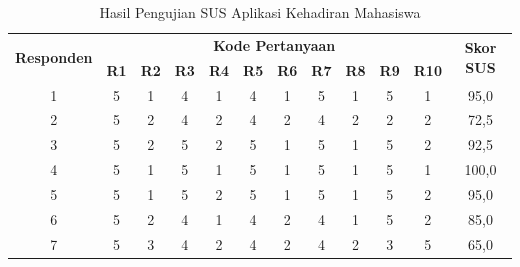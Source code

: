 \begin{table}[H]
\fontsize{10}{12}\selectfont
\center
\caption{Hasil Pengujian SUS Aplikasi Kehadiran Mahasiswa}
\label{sus-aplikasi-mahasiswa}
\begin{tabular}{|c|c|c|c|c|c|c|c|c|c|c|c|}
\hline
\multirow{2}{*}{\textbf{Responden}} & \multicolumn{10}{c|}{\textbf{Kode Pertanyaan}}                                                                                                                  & \multirow{2}{*}{\textbf{Skor SUS}} \\ \cline{2-11}
                                    & \textbf{R1} & \textbf{R2} & \textbf{R3} & \textbf{R4} & \textbf{R5} & \textbf{R6} & \textbf{R7} & \textbf{R8} & \textbf{R9} & \multicolumn{1}{l|}{\textbf{R10}} &                                    \\ \hline
1                                   & 5           & 1           & 4           & 1           & 4           & 1           & 5           & 1           & 5           & 1                                 & 95,0                                 \\ \hline
2                                   & 5           & 2           & 4           & 2           & 4           & 2           & 4           & 2           & 2           & 2                                 & 72,5                               \\ \hline
3                                   & 5           & 2           & 5           & 2           & 5           & 1           & 5           & 1           & 5           & 2                                 & 92,5                               \\ \hline
4                                   & 5           & 1           & 5           & 1           & 5           & 1           & 5           & 1           & 5           & 1                                 & 100,0                                \\ \hline
5                                   & 5           & 1           & 5           & 2           & 5           & 1           & 5           & 1           & 5           & 2                                 & 95,0                                 \\ \hline
6                                   & 5           & 2           & 4           & 1           & 4           & 2           & 4           & 1           & 5           & 2                                 & 85,0                                 \\ \hline
7                                   & 5           & 3           & 4           & 2           & 4           & 2           & 4           & 2           & 3           & 5                                 & 65,0                                 \\ \hline

\end{tabular}
\end{table}
